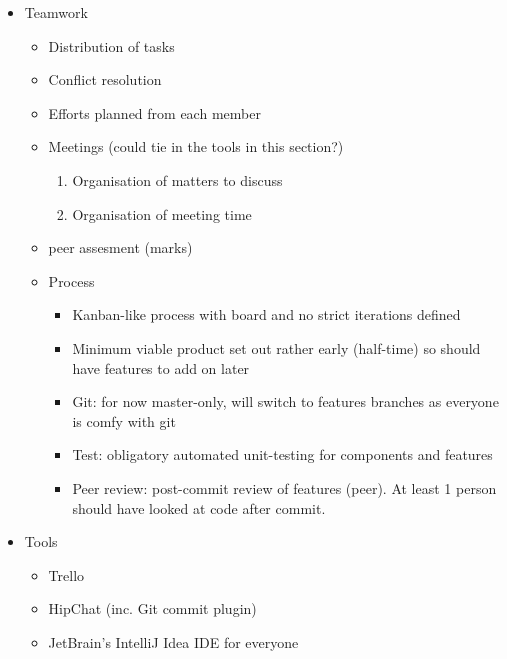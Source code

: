\begin{itemize}
	\item Teamwork
	\begin{itemize}
		\item Distribution of tasks
    	\item Conflict resolution
    	\item Efforts planned from each member
    	\item Meetings (could tie in the tools in this section?)
        \begin{enumerate}
            \item Organisation of matters to discuss
            \item Organisation of meeting time
        \end{enumerate}
        \item peer assesment (marks)

        \item Process
        \begin{itemize}
            \item Kanban-like process with board and no strict iterations defined
            \item Minimum viable product set out rather early (half-time) so should have features to add on later
            \item Git: for now master-only, will switch to features branches as everyone is comfy with git
            \item Test: obligatory automated unit-testing for components and features
            \item Peer review: post-commit review of features (peer). At least 1 person should have looked at code after commit.
        \end{itemize}
	\end{itemize}

	\item Tools
	\begin{itemize}
		\item Trello
		\item HipChat (inc. Git commit plugin)
	    \item JetBrain's IntelliJ Idea IDE for everyone
	\end{itemize}

\end{itemize}
